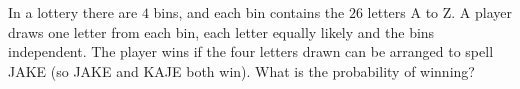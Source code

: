 In a lottery there are $4$ bins, and each bin contains the $26$ letters A to Z. A player draws one letter from each bin, each letter equally likely and the bins independent. The player wins if the four letters drawn can be arranged to spell JAKE (so JAKE and KAJE both win). What is the probability of winning?
